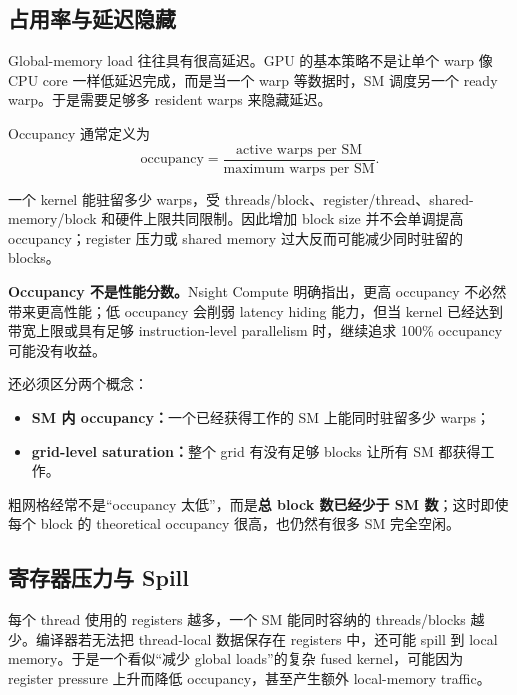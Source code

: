 \subsection{占用率与延迟隐藏}

Global-memory load 往往具有很高延迟。GPU 的基本策略不是让单个 warp 像 CPU core 一样低延迟完成，而是当一个 warp 等数据时，SM 调度另一个 ready warp。于是需要足够多 resident warps 来隐藏延迟。

Occupancy 通常定义为
\begin{equation}
\text{occupancy}
=\frac{\text{active warps per SM}}
{\text{maximum warps per SM}}.
\label{eq:gpu-occupancy}
\end{equation}

一个 kernel 能驻留多少 warps，受 threads/block、register/thread、shared-memory/block 和硬件上限共同限制\cite{cudaProgramming2026}。因此增加 block size 并不会单调提高 occupancy；register 压力或 shared memory 过大反而可能减少同时驻留的 blocks。

\begin{warningbox}
\textbf{Occupancy 不是性能分数。}Nsight Compute 明确指出，更高 occupancy 不必然带来更高性能；低 occupancy 会削弱 latency hiding 能力，但当 kernel 已经达到带宽上限或具有足够 instruction-level parallelism 时，继续追求 100\% occupancy 可能没有收益\cite{nsightCompute2026}。
\end{warningbox}

还必须区分两个概念：

\begin{itemize}
\item \textbf{SM 内 occupancy：}一个已经获得工作的 SM 上能同时驻留多少 warps；
\item \textbf{grid-level saturation：}整个 grid 有没有足够 blocks 让所有 SM 都获得工作。
\end{itemize}

粗网格经常不是“occupancy 太低”，而是\textbf{总 block 数已经少于 SM 数}；这时即使每个 block 的 theoretical occupancy 很高，也仍然有很多 SM 完全空闲。

\subsection{寄存器压力与 Spill}

每个 thread 使用的 registers 越多，一个 SM 能同时容纳的 threads/blocks 越少。编译器若无法把 thread-local 数据保存在 registers 中，还可能 spill 到 local memory。于是一个看似“减少 global loads”的复杂 fused kernel，可能因为 register pressure 上升而降低 occupancy，甚至产生额外 local-memory traffic。

